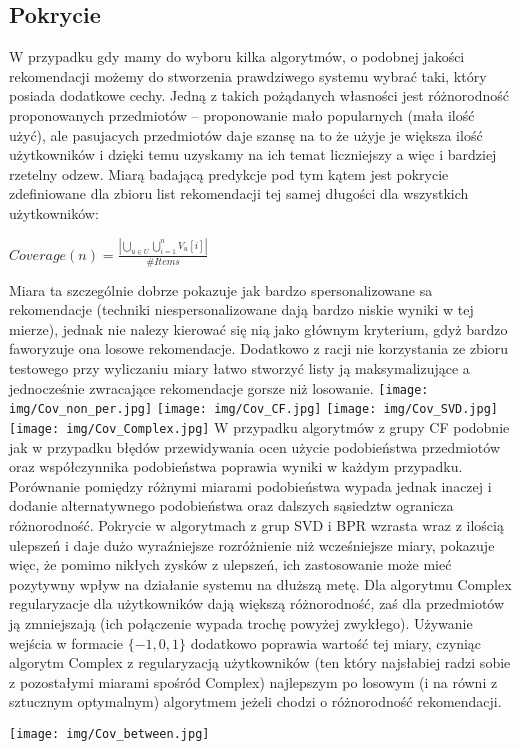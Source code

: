 \documentclass{pracamgr}
\begin{document}
   \subsection{Pokrycie}
    W przypadku gdy mamy do wyboru kilka algorytmów, o podobnej jakości rekomendacji możemy do stworzenia prawdziwego systemu wybrać taki,
    który posiada dodatkowe cechy. Jedną z takich pożądanych własności jest różnorodność proponowanych przedmiotów -- proponowanie mało popularnych
    (mała ilość użyć), ale pasujacych przedmiotów daje szansę na to że użyje je większa ilość użytkowników i dzięki temu uzyskamy na ich temat liczniejszy
    a więc i bardziej rzetelny odzew. Miarą badającą predykcje pod tym kątem jest pokrycie zdefiniowane dla zbioru list rekomendacji tej samej
    długości dla wszystkich użytkowników:
    \begin{center}
     $Coverage(n)=\frac{|\bigcup\limits_{u\in U}\bigcup\limits_{i=1}^{n}V_u[i]|}{\#Items}$
    \end{center}
    Miara ta szczególnie dobrze pokazuje jak bardzo spersonalizowane sa rekomendacje (techniki niespersonalizowane dają bardzo niskie wyniki w tej mierze),
    jednak nie nalezy kierować się nią jako głównym kryterium, gdyż bardzo faworyzuje ona losowe rekomendacje.
    Dodatkowo z racji nie korzystania ze zbioru testowego przy wyliczaniu miary łatwo stworzyć listy ją maksymalizujące
    a jednocześnie zwracające rekomendacje gorsze niż losowanie.\newline
    \texttt{[image: img/Cov\_non\_per.jpg]}
    \texttt{[image: img/Cov\_CF.jpg]}\newline
    \texttt{[image: img/Cov\_SVD.jpg]}
    \texttt{[image: img/Cov\_Complex.jpg]}\newline
    W przypadku algorytmów z grupy CF podobnie jak w przypadku błędów przewidywania ocen użycie podobieństwa przedmiotów oraz współczynnika podobieństwa
    poprawia wyniki w każdym przypadku. Porównanie pomiędzy różnymi miarami podobieństwa wypada jednak inaczej i dodanie alternatywnego podobieństwa oraz dalszych
    sąsiedztw ogranicza różnorodność.
    Pokrycie w algorytmach z grup SVD i BPR wzrasta wraz z ilością ulepszeń i daje dużo wyraźniejsze rozróżnienie niż wcześniejsze miary, pokazuje więc, 
    że pomimo nikłych zysków z ulepszeń, ich zastosowanie może mieć pozytywny wpływ na działanie systemu na dłuższą metę.
    Dla algorytmu Complex regularyzacje dla użytkowników dają większą różnorodność, zaś dla przedmiotów ją zmniejszają
    (ich połączenie wypada trochę powyżej zwykłego). Używanie wejścia w formacie $\{-1,0,1\}$ dodatkowo poprawia wartość tej miary,
    czyniąc algorytm Complex z regularyzacją użytkowników (ten który najsłabiej radzi sobie z pozostałymi miarami spośród Complex)
    najlepszym po losowym (i na równi z sztucznym optymalnym) algorytmem jeżeli chodzi o różnorodność rekomendacji.
    \begin{center}
    \texttt{[image: img/Cov\_between.jpg]}
    \end{center}
\end{document}
